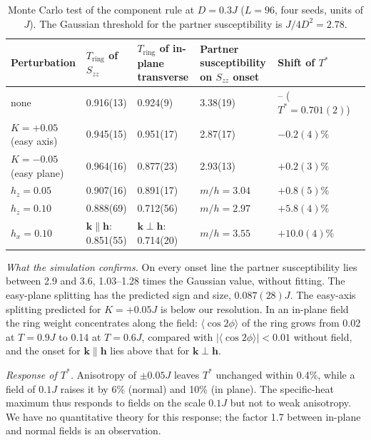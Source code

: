 \documentclass[prb,reprint,longbibliography,superscriptaddress,amsmath,amssymb]{revtex4-2}
\newcommand{\Ts}{T^{*}}
\newcommand{\Tr}{T_{\mathrm{ring}}}
\newcommand{\kv}{\mathbf{k}}
\begin{document}
\begin{table}[tb]
\caption{Monte Carlo test of the component rule at $D=0.3J$ ($L=96$, four seeds, units of $J$). The Gaussian threshold for the partner susceptibility is $J/4D^2=2.78$.}
\label{tab:comp}
\begin{ruledtabular}
\begin{tabular}{llllll}
Perturbation & $\Tr$ of $S_{zz}$ & $\Tr$ of in-plane transverse & Partner susceptibility on $S_{zz}$ onset & Shift of $\Ts$ \\
\hline
none                  & 0.916(13) & 0.924(9)  & 3.38(19)    & -- ($\Ts=0.701(2)$) \\
$K=+0.05$ (easy axis) & 0.945(15) & 0.951(17) & 2.87(17)    & $-0.2(4)\%$ \\
$K=-0.05$ (easy plane)& 0.964(16) & 0.877(23) & 2.93(13)    & $+0.2(3)\%$ \\
$h_z=0.05$            & 0.907(16) & 0.891(17) & $m/h=3.04$  & $+0.8(5)\%$ \\
$h_z=0.10$            & 0.888(69) & 0.712(56) & $m/h=2.97$  & $+5.8(4)\%$ \\
$h_x=0.10$            & $\kv\parallel\mathbf h$: 0.851(55) & $\kv\perp\mathbf h$: 0.714(20) & $m/h=3.55$ & $+10.0(4)\%$ \\
\end{tabular}
\end{ruledtabular}
\end{table}

\textit{What the simulation confirms.} On every onset line the partner susceptibility lies between 2.9 and 3.6, 1.03--1.28 times the Gaussian value, without fitting. The easy-plane splitting has the predicted sign and size, $0.087(28)J$. The easy-axis splitting predicted for $K=+0.05J$ is below our resolution. In an in-plane field the ring weight concentrates along the field: $\langle\cos2\phi\rangle$ of the ring grows from 0.02 at $T=0.9J$ to 0.14 at $T=0.6J$, compared with $|\langle\cos2\phi\rangle|<0.01$ without field, and the onset for $\kv\parallel\mathbf h$ lies above that for $\kv\perp\mathbf h$.

\textit{Response of $\Ts$.} Anisotropy of $\pm0.05J$ leaves $\Ts$ unchanged within 0.4\%, while a field of $0.1J$ raises it by 6\% (normal) and 10\% (in plane). The specific-heat maximum thus responds to fields on the scale $0.1J$ but not to weak anisotropy. We have no quantitative theory for this response; the factor 1.7 between in-plane and normal fields is an observation.

\end{document}

